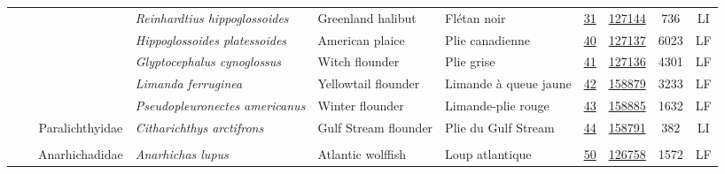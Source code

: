 \documentclass[12pt]{article}\usepackage[]{graphicx}\usepackage[]{color}
\begin{document}
\begin{landscapepage}
\begin{longtable}[t]{ccc>{\centering\arraybackslash}p{3cm}>{\centering\arraybackslash}p{3cm}>{\centering\arraybackslash}p{3cm}>{}c>{}ccc}
\nopagebreak
\hspace{1em}\hspace{1em} &  &  & \em{Reinhardtius hippoglossoides} & Greenland halibut & Flétan noir & \href{#sec:31}{31} & \href{http://www.marinespecies.org/aphia.php?p=taxdetails&id=127144}{127144} & 736 & LI\\
\nopagebreak
\hspace{1em}\hspace{1em} &  &  & \em{Hippoglossoides platessoides} & American plaice & Plie canadienne & \href{#sec:40}{40} & \href{http://www.marinespecies.org/aphia.php?p=taxdetails&id=127137}{127137} & 6023 & LF\\
\nopagebreak
\hspace{1em}\hspace{1em} &  &  & \em{Glyptocephalus cynoglossus} & Witch flounder & Plie grise & \href{#sec:41}{41} & \href{http://www.marinespecies.org/aphia.php?p=taxdetails&id=127136}{127136} & 4301 & LF\\
\nopagebreak
\hspace{1em}\hspace{1em} &  &  & \em{Limanda ferruginea} & Yellowtail flounder & Limande à queue jaune & \href{#sec:42}{42} & \href{http://www.marinespecies.org/aphia.php?p=taxdetails&id=158879}{158879} & 3233 & LF\\
\nopagebreak
\hspace{1em}\hspace{1em} &  &  & \em{Pseudopleuronectes americanus} & Winter flounder & Limande-plie rouge & \href{#sec:43}{43} & \href{http://www.marinespecies.org/aphia.php?p=taxdetails&id=158885}{158885} & 1632 & LF\\
\nopagebreak
\hspace{1em}\hspace{1em} &  & Paralichthyidae & \em{Citharichthys arctifrons} & Gulf Stream flounder & Plie du Gulf Stream & \href{#sec:44}{44} & \href{http://www.marinespecies.org/aphia.php?p=taxdetails&id=158791}{158791} & 382 & LI\\
\nopagebreak
\addlinespace[0.3em]
\\
\hspace{1em}\hspace{1em} &  & Anarhichadidae & \em{Anarhichas lupus} & Atlantic wolffish & Loup atlantique & \href{#sec:50}{50} & \href{http://www.marinespecies.org/aphia.php?p=taxdetails&id=126758}{126758} & 1572 & LF\\

\end{longtable}
\end{landscapepage}
\end{document}
